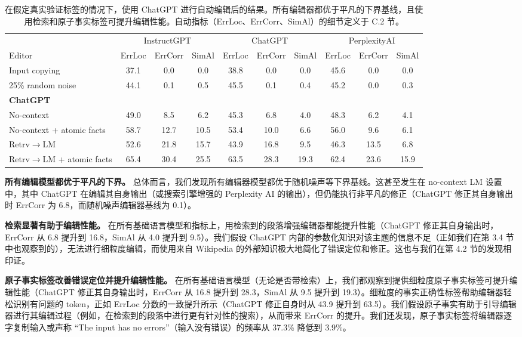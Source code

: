 \documentclass[11pt,UTF8,fontset=fandol]{ctexart}
\begin{document}
\begin{table}[H]\centering
\caption{在假定真实验证标签的情况下，使用 ChatGPT 进行自动编辑后的结果。所有编辑器都优于平凡的下界基线，且使用检索和原子事实标签可提升编辑性能。自动指标（ErrLoc、ErrCorr、SimAl）的细节定义于 C.2 节。}
\label{tab:14}
\small
\setlength{\tabcolsep}{4pt}
\begin{tabular}{lccccccccc}
\toprule
 & \multicolumn{3}{c}{InstructGPT} & \multicolumn{3}{c}{ChatGPT} & \multicolumn{3}{c}{PerplexityAI} \\
Editor & ErrLoc & ErrCorr & SimAl & ErrLoc & ErrCorr & SimAl & ErrLoc & ErrCorr & SimAl \\
\midrule
Input copying & 37.1 & 0.0 & 0.0 & 38.8 & 0.0 & 0.0 & 45.6 & 0.0 & 0.0 \\
25\% random noise & 44.1 & 0.1 & 0.5 & 45.5 & 0.1 & 0.4 & 45.2 & 0.0 & 0.3 \\
\midrule
\multicolumn{10}{l}{\textbf{ChatGPT}} \\
No-context & 49.0 & 8.5 & 6.2 & 45.3 & 6.8 & 4.0 & 48.3 & 6.2 & 4.1 \\
No-context + atomic facts & 58.7 & 12.7 & 10.5 & 53.4 & 10.0 & 6.6 & 56.0 & 9.6 & 6.1 \\
Retrv$\rightarrow$LM & 52.6 & 21.8 & 15.7 & 43.9 & 16.8 & 9.5 & 46.3 & 13.5 & 6.8 \\
Retrv$\rightarrow$LM + atomic facts & 65.4 & 30.4 & 25.5 & 63.5 & 28.3 & 19.3 & 62.4 & 23.6 & 15.9 \\
\bottomrule
\end{tabular}
\end{table}

\textbf{所有编辑模型都优于平凡的下界。} 总体而言，我们发现所有编辑器模型都优于随机噪声等下界基线。这甚至发生在 no-context LM 设置中，其中 ChatGPT 在编辑其自身输出（或搜索引擎增强的 Perplexity AI 的输出），但仍能执行非平凡的修正（ChatGPT 修正其自身输出时 ErrCorr 为 6.8，而随机噪声编辑器基线为 0.1）。

\textbf{检索显著有助于编辑性能。} 在所有基础语言模型和指标上，用检索到的段落增强编辑器都能提升性能（ChatGPT 修正其自身输出时，ErrCorr 从 6.8 提升到 16.8，SimAl 从 4.0 提升到 9.5）。我们假设 ChatGPT 内部的参数化知识对该主题的信息不足（正如我们在第 3.4 节中也观察到的），无法进行细粒度编辑，而使用来自 Wikipedia 的外部知识极大地简化了错误定位和修正。这也与我们在第 4.2 节的发现相印证。

\textbf{原子事实标签改善错误定位并提升编辑性能。} 在所有基础语言模型（无论是否带检索）上，我们都观察到提供细粒度原子事实标签可提升编辑性能（ChatGPT 修正其自身输出时，ErrCorr 从 16.8 提升到 28.3，SimAl 从 9.5 提升到 19.3）。细粒度的事实正确性标签帮助编辑器轻松识别有问题的 token，正如 ErrLoc 分数的一致提升所示（ChatGPT 修正自身时从 43.9 提升到 63.5）。我们假设原子事实有助于引导编辑器进行其编辑过程（例如，在检索到的段落中进行更有针对性的搜索），从而带来 ErrCorr 的提升。我们还发现，原子事实标签将编辑器逐字复制输入或声称 “The input has no errors”（输入没有错误）的频率从 37.3\% 降低到 3.9\%。
\end{document}
